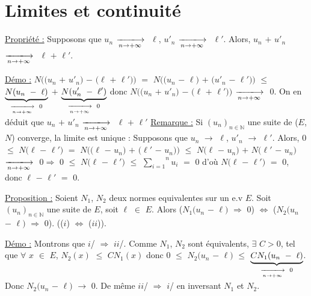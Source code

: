 \documentclass{article}
\begin{document}
\section{Limites et continuité}

\smallbreak
\underline{Propriété :} Supposons que $u_n$ $\tendplusinf$ $\ell$,  $u'_n$ $\tendplusinf$ $\ell'$. Alors,  $u_n$  $+$ $u'_n$ $\tendplusinf$ $\ell$ $+$ $\ell'$.

\smallbreak
\underline{Démo :} 
\parindent=1cm
\smallbreak
$N((u_n$ $+$ $u'_n)$ $-$ $(\ell$ $+$ $\ell'))$ $=$ $N((u_n$ $-$ $\ell)$ $+$ $(u'_n$ $-$ $\ell'))$ $\leqslant$ $\underset{\tendplusinf \text{ }0}{\underbrace{N(u_n\text{ }-\text{ }\ell)}}$ $+$ $\underset{\tendplusinf \text{ }0}{\underbrace{ N(u'_n\text{ }-\text{ }\ell')}}$ 
\smallbreak
donc $N((u_n$ $+$ $u'_n)$ $-$ $(\ell$ $+$ $\ell'))$ $\tendplusinf$ $0$. On en déduit que $u_n$  $+$ $u'_n$ $\tendplusinf$ $\ell$ $+$ $\ell'$
\smallbreak
\parindent=0cm
\underline{Remarque :} \parindent=1cm \smallbreak
Si $(u_n)_{n \in \mathbb{N}}$ une suite de ($E$, $N$) converge, la limite est unique : Supposons que $u_n$ $\longrightarrow$ $\ell$,  $u'_n$ $\longrightarrow$ $\ell'$. Alors, \smallbreak $0$ $\leqslant$ $N(\ell$ $-$ $\ell')$ $=$ $N((\ell$ $-$ $u_n)$ $+$ $(\ell'$ $-$ $u_n))$ $\leqslant$ $N(\ell$ $-$ $u_n)$ $+$ $N(\ell'$ $-$ $u_n)$ $\tendplusinf$ $0$\smallbreak $\Longrightarrow$ $0$ $\leqslant$ $N(\ell$ $-$ $\ell')$ $\leqslant$ \liminfty $\overset{n}{\underset{i = 1}{\sum}}u_i$ $=$ $0$ d'où $N(\ell$ $-$ $\ell')$ $=$ $0$, donc $\ell$ $-$ $\ell'$ $=$ $0$.

\smallbreak
\parindent=0cm
\underline{Proposition :} \parindent=1cm \smallbreak
Soient $N_1$, $N_2$ deux normes equivalentes sur un e.v $E$. Soit $(u_n)_{n \in \mathbb{N}}$ une suite de $E$, soit $\ell$ $\in$ $E$. Alors \smallbreak ($N_1(u_n$ $-$ $\ell)$ $\Longrightarrow$ $0$) $\Longleftrightarrow$ ($N_2(u_n$ $-$ $\ell)$ $\Longrightarrow$ $0$). (($i$) $\Longleftrightarrow$ ($ii$)).

\parindent=0cm
\underline{Démo :} \parindent=1cm \smallbreak Montrons que $i$/ $\Longrightarrow$ $ii$/. Comme $N_1$, $N_2$ sont équivalents, $\exists$ $C>0$, tel que $\forall$ $x$ $\in$ $E$, $N_2(x)$ $\leqslant$ $CN_1(x)$ donc \smallbreak $0$ $\leqslant$ $N_2(u_n$ $-$ $\ell)$ $\leqslant$ $\underset{ \tendplusinf \text{ }0}{\underbrace{CN_1(u_n\text{ }-\text{ }\ell)}}$. Donc $N_2(u_n$ $-$ $\ell)$ $\longrightarrow$ $0$. De même $ii$/ $\Longrightarrow$ $i$/ en inversant $N_1$ et $N_2$.
\end{document}
